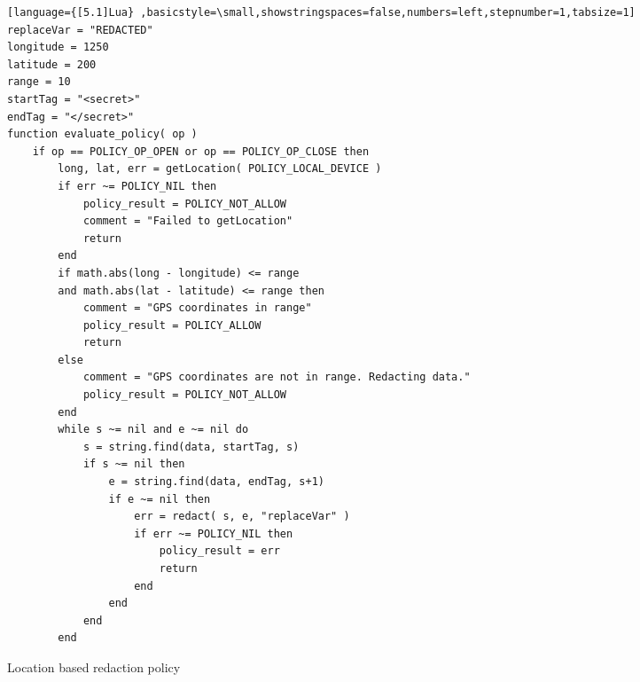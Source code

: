 \begin{figure*}[t]
\begin{lstlisting}[language={[5.1]Lua} ,basicstyle=\small,showstringspaces=false,numbers=left,stepnumber=1,tabsize=1]
replaceVar = "REDACTED"
longitude = 1250
latitude = 200
range = 10
startTag = "<secret>"
endTag = "</secret>"
function evaluate_policy( op )
    if op == POLICY_OP_OPEN or op == POLICY_OP_CLOSE then
        long, lat, err = getLocation( POLICY_LOCAL_DEVICE )
        if err ~= POLICY_NIL then
            policy_result = POLICY_NOT_ALLOW
            comment = "Failed to getLocation"
            return
        end
        if math.abs(long - longitude) <= range
        and math.abs(lat - latitude) <= range then
            comment = "GPS coordinates in range"
            policy_result = POLICY_ALLOW
            return
        else
            comment = "GPS coordinates are not in range. Redacting data."
            policy_result = POLICY_NOT_ALLOW
        end
        while s ~= nil and e ~= nil do
            s = string.find(data, startTag, s)
            if s ~= nil then
                e = string.find(data, endTag, s+1)
                if e ~= nil then
                    err = redact( s, e, "replaceVar" )
                    if err ~= POLICY_NIL then
                        policy_result = err
                        return
                    end
                end
            end
        end
\end{lstlisting}
\caption{Location based redaction policy}
\label{fig:location_redaction_policy}
\end{figure*}



